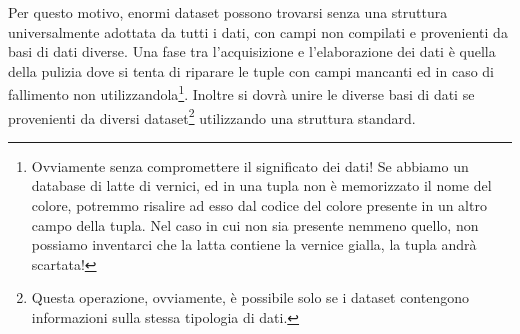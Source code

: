 Per questo motivo, enormi dataset possono trovarsi senza una struttura universalmente adottata da tutti i dati, con campi non compilati e provenienti da basi di dati diverse. Una fase tra l'acquisizione e l'elaborazione dei dati è quella della pulizia dove si tenta di riparare le tuple con campi mancanti ed in caso di fallimento non utilizzandola\footnote{Ovviamente senza compromettere il significato dei dati! Se abbiamo un database di latte di vernici, ed in una tupla non è memorizzato il nome del colore, potremmo risalire ad esso dal codice del colore presente in un altro campo della tupla. Nel caso in cui non sia presente nemmeno quello, non possiamo inventarci che la latta contiene la vernice gialla, la tupla andrà scartata!}. Inoltre si dovrà unire le diverse basi di dati se provenienti da diversi dataset\footnote{Questa operazione, ovviamente, è possibile solo se i dataset contengono informazioni sulla stessa tipologia di dati.} utilizzando una struttura standard.
